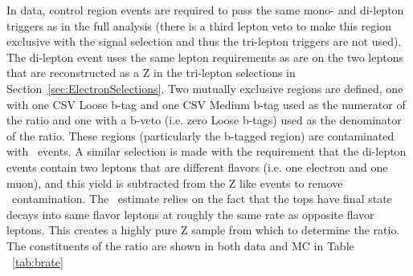 %

In data, control region events are required to pass the same mono- and di-lepton triggers as in the full analysis (there is a third lepton veto to make this region exclusive with the signal selection and thus the tri-lepton triggers are not used). The di-lepton event uses the same lepton requirements as are on the two leptons that are reconstructed as a Z in the tri-lepton selections in Section~\ref{sec:ElectronSelections}. Two mutually exclusive regions are defined, one with one CSV Loose b-tag and one CSV Medium b-tag used as the numerator of the ratio and one with a b-veto (i.e. zero Loose b-tags) used as the denominator of the ratio. These regions (particularly the b-tagged region) are contaminated with \ttbar \ events. A similar selection is made with the requirement that the di-lepton events contain two leptons that are different flavors (i.e. one electron and one muon), and this yield is subtracted from the Z like events to remove \ttbar \ contamination. The \ttbar \ estimate relies on the fact that the tops have final state decays into same flavor leptons at roughly the same rate as opposite flavor leptons. This creates a highly pure Z sample from which to determine the ratio. The constituents of the ratio are shown in both data and MC in Table ~\ref{tab:brate}

